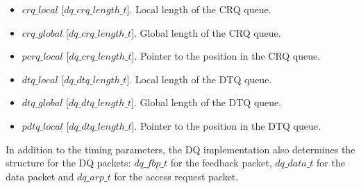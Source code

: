 \begin{itemize}
\item $crq\_local$ [$dq\_crq\_length\_t$]. Local length of the CRQ queue.
\item $crq\_global$ [$dq\_crq\_length\_t$]. Global length of the CRQ queue.
\item $pcrq\_local$ [$dq\_crq\_length\_t$]. Pointer to the position in the CRQ queue.

\item $dtq\_local$ [$dq\_dtq\_length\_t$]. Local length of the DTQ queue.
\item $dtq\_global$ [$dq\_dtq\_length\_t$]. Global length of the DTQ queue.
\item $pdtq\_local$ [$dq\_dtq\_length\_t$]. Pointer to the position in the DTQ queue.
\end{itemize}

In addition to the timing parameters, the DQ implementation also determines the structure for the DQ packets: $dq\_fbp\_t$ for the feedback packet, $dq\_data\_t$ for the data packet and $dq\_arp\_t$ for the access request packet.

